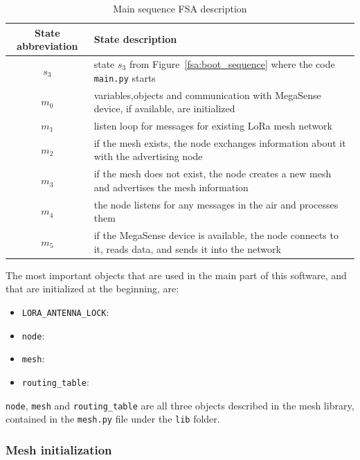 				\begin{table}[h]
					\begin{center}
						\begin{tabular}{|c|m{10.2cm}|} 
							\hline
							\textbf{State abbreviation} & \textbf{State description} \\\hline
							$s_{3}$ & state $s_{3}$ from Figure~\ref{fsa:boot_sequence} where the code \texttt{main.py} starts\\\hline
							$m_{0}$ & variables,objects and communication with MegaSense device, if available, are initialized\\\hline
							$m_{1}$ & listen loop for messages for existing LoRa mesh network\\\hline
							$m_{2}$ & if the mesh exists, the node exchanges information about it with the advertising node\\\hline
							$m_{3}$ & if the mesh does not exist, the node creates a new mesh and advertises the mesh information\\\hline
							$m_{4}$ & the node listens for any messages in the air and processes them\\\hline
							$m_{5}$ & if the MegaSense device is available, the node connects to it, reads data, and sends it into the network\\\hline
						\end{tabular}
						\caption{Main sequence FSA description}
						\label{table:fsa_main}
					\end{center}
				\end{table}
			
				The most important objects that are used in the main part of this software, and that are initialized at the beginning, are:
				\begin{itemize}
					\item \texttt{LORA\_ANTENNA\_LOCK}: %
				    \item \texttt{node}:
					\item \texttt{mesh}:
					\item \texttt{routing\_table}:
				\end{itemize}
			
				\texttt{node}, \texttt{mesh} and \texttt{routing\_table} are all three objects described in the mesh library, contained in the \texttt{mesh.py} file under the \texttt{lib} folder.
				
			\subsubsection{Mesh initialization}
			
